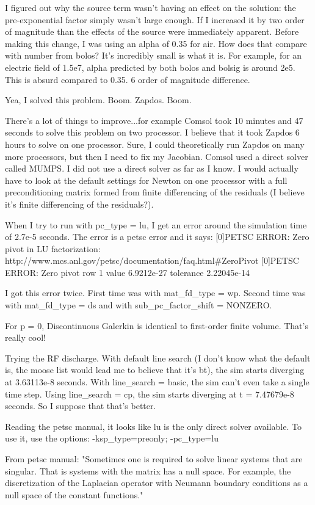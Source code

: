 I figured out why the source term wasn't having an effect on the solution: the pre-exponential factor simply wasn't large enough. If I increased it by two order of magnitude than the effects of the source were immediately apparent. Before making this change, I was using an alpha of 0.35 for air. How does that compare with number from bolos? It's incredibly small is what it is. For example, for an electric field of 1.5e7, alpha predicted by both bolos and bolsig is around 2e5. This is absurd compared to 0.35. 6 order of magnitude difference.

Yea, I solved this problem. Boom. Zapdos. Boom.

There's a lot of things to improve...for example Comsol took 10 minutes and 47 seconds to solve this problem on two processor. I believe that it took Zapdos 6 hours to solve on one processor. Sure, I could theoretically run Zapdos on many more processors, but then I need to fix my Jacobian. Comsol used a direct solver called MUMPS. I did not use a direct solver as far as I know. I would actually have to look at the default settings for Newton on one processor with a full preconditioning matrix formed from finite differencing of the residuals (I believe it's finite differencing of the residuals?).

When I try to run with pc_type = lu, I get an error around the simulation time of 2.7e-5 seconds. The error is a petsc error and it says:
[0]PETSC ERROR: Zero pivot in LU factorization: http://www.mcs.anl.gov/petsc/documentation/faq.html#ZeroPivot
[0]PETSC ERROR: Zero pivot row 1 value 6.9212e-27 tolerance 2.22045e-14

I got this error twice. First time was with mat_fd_type = wp. Second time was with mat_fd_type = ds and with sub_pc_factor_shift = NONZERO.

For p = 0, Discontinuous Galerkin is identical to first-order finite volume. That's really cool!

Trying the RF discharge. With default line search (I don't know what the default is, the moose list would lead me to believe that it's bt), the sim starts diverging at 3.63113e-8 seconds. With line_search = basic, the sim can't even take a single time step. Using line_search = cp, the sim starts diverging at t = 7.47679e-8 seconds. So I suppose that that's better.

Reading the petsc manual, it looks like lu is the only direct solver available. To use it, use the options: -ksp_type=preonly; -pc_type=lu

From petsc manual: "Sometimes one is required to solve linear systems that are singular. That is systems with the matrix has a null space. For example, the discretization of the Laplacian operator with Neumann boundary conditions as a null space of the constant functions."

